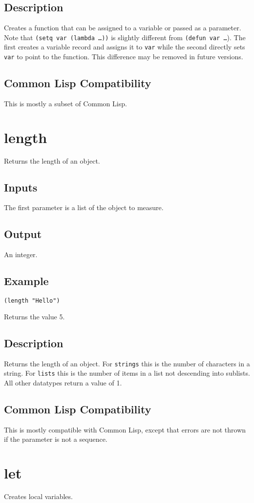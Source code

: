 \documentclass[10pt, openany]{book}
\newcommand{\keyword}[1]{\texttt{#1}}
\newcommand{\datatype}[1]{\texttt{#1}}
\newcommand{\cl}{Common Lisp}
\begin{document}
\subsection{Description}
Creates a function that can be assigned to a variable or passed as a parameter.  Note that \keyword{(setq var (lambda \dots))} is slightly different from \keyword{(defun var \dots}).  The first creates a variable record and assigns it to \keyword{var} while the second directly sets \keyword{var} to point to the function.  This difference may be removed in future versions.
\subsection{Common Lisp Compatibility}
This is mostly a subset of \cl.

\section{length}
Returns the length of an object.
\subsection{Inputs}
The first parameter is a list of the object to measure.
\subsection{Output}
An integer.
\subsection{Example}
\begin{lstlisting}
(length "Hello")
\end{lstlisting}
Returns the value 5.
\subsection{Description}
Returns the length of an object.  For \datatype{strings} this is the number of characters in a string.  For \datatype{lists} this is the number of items in a list not descending into sublists.  All other datatypes return a value of 1.
\subsection{Common Lisp Compatibility}
This is mostly compatible with \cl, except that errors are not thrown if the parameter is not a sequence.

\section{let}
Creates local variables.
\end{document}

